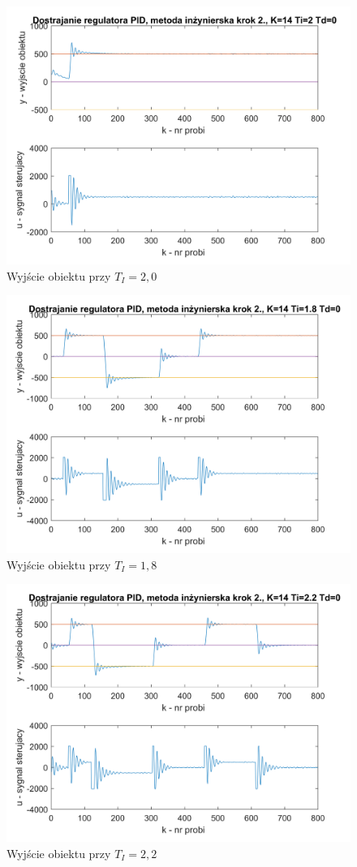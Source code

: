 \documentclass[a4paper, 10pt]{article}
\begin{document}
\begin{figure}[H]
	\centering
	\includegraphics[width=0.9\linewidth]{MI_ti2000}
	\caption{Wyjście obiektu przy $T_{I}=2,0$ }
	\label{fig:MI_ti2000}
\end{figure}
\begin{figure}[H]
	\centering
	\includegraphics[width=0.9\linewidth]{MI_ti1800}
	\caption{Wyjście obiektu przy $T_{I}=1,8$ }
	\label{fig:MI_ti1800}
\end{figure}
\begin{figure}[H]
	\centering
	\includegraphics[width=0.9\linewidth]{MI_ti2200}
	\caption{Wyjście obiektu przy $T_{I}=2,2$ }
	\label{fig:MI_ti2200}
\end{figure}
\end{document}
